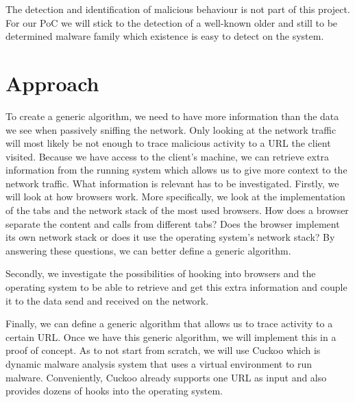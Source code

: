 \documentclass{scrartcl}
\begin{document}
The detection and identification of malicious behaviour is not part of this project. For our PoC we will stick to the detection of a well-known older and still to be determined malware family which existence is easy to detect on the system. 



\section{Approach}

To create a generic algorithm, we need to have more information than the data we see when passively sniffing the network. Only looking at the network traffic will most likely be not enough to trace malicious activity to a URL the client visited. Because we have access to the client's machine, we can retrieve extra information from the running system which allows us to give more context to the network traffic. What information is relevant has to be investigated. Firstly, we will look at how browsers work. More specifically, we look at the implementation of the tabs and the network stack of the most used browsers. How does a browser separate the content and calls from different tabs? Does the browser implement its own network stack or does it use the operating system's network stack? By answering these questions, we can better define a generic algorithm.

Secondly, we investigate the possibilities of hooking into browsers and the operating system to be able to retrieve and get this extra information and couple it to the data send and received on the network. 

Finally, we can define a generic algorithm that allows us to trace activity to a certain URL. Once we have this generic algorithm, we will implement this in a proof of concept. As to not start from scratch, we will use Cuckoo which is dynamic malware analysis system that uses a virtual environment to run malware. Conveniently, Cuckoo already supports one URL as input and also provides dozens of hooks into the operating system. 
\end{document}
